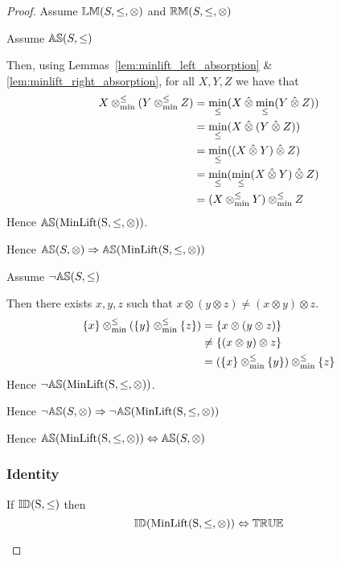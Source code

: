 \documentclass[../Summary.tex]{subfiles}
\begin{document}
\begin{proof}
Assume ${\mathbb{LM}}(S,\leq,\otimes)$ and ${\mathbb{RM}}(S,\leq,\otimes)$

Assume ${\mathbb{AS}}(S,\leq)$
\begin{ind}
Then, using Lemmas~\ref{lem:minlift_left_absorption} \& \ref{lem:minlift_right_absorption}, for all $X,Y,Z$ we have that
\begin{align*}
X \mathbin{\otimes_{\min}^{\leq}} (Y \mathbin{\otimes_{\min}^{\leq}} Z) 	& = \min_\leq(X \mathbin{\hat{\otimes}} \min_\leq(Y \mathbin{\hat{\otimes}} Z)) \\
							& = \min_\leq(X \mathbin{\hat{\otimes}} (Y \mathbin{\hat{\otimes}} Z)) \\
							& = \min_\leq((X \mathbin{\hat{\otimes}} Y) \mathbin{\hat{\otimes}} Z) \\
							& = \min_\leq(\min_\leq(X \mathbin{\hat{\otimes}} Y) \mathbin{\hat{\otimes}} Z) \\
							& = (X \mathbin{\otimes_{\min}^{\leq}} Y) \mathbin{\otimes_{\min}^{\leq}} Z
\end{align*}
Hence ${\mathbb{AS}}(\mathrm{MinLift(S,\leq,\otimes)})$.
\end{ind}
Hence ${\mathbb{AS}}(S,\otimes) \Rightarrow {\mathbb{AS}}(\mathrm{MinLift(S,\leq,\otimes)})$

\vspace{2em}


Assume $\neg {\mathbb{AS}}(S,\leq)$

\begin{ind}
Then there exists $x,y,z$ such that $x \otimes (y \otimes z) \neq (x \otimes y) \otimes z$.
\begin{align*}
\{ x \} \mathbin{\otimes_{\min}^{\leq}} (\{ y \} \mathbin{\otimes_{\min}^{\leq}} \{ z \}) 	& = \{x \otimes (y \otimes z)\} \\	
												& \neq \{ (x \otimes y) \otimes z \} \\
												& = (\{ x \} \mathbin{\otimes_{\min}^{\leq}} \{ y \}) \mathbin{\otimes_{\min}^{\leq}} \{ z \}
\end{align*}
Hence $\neg {\mathbb{AS}}(\mathrm{MinLift(S,\leq,\otimes)})$.
\end{ind}
Hence $\neg {\mathbb{AS}}(S,\otimes) \Rightarrow \neg {\mathbb{AS}}(\mathrm{MinLift(S,\leq,\otimes)})$

\vspace{2em}

Hence ${\mathbb{AS}}(\mathrm{MinLift(S,\leq,\otimes)}) \Leftrightarrow {\mathbb{AS}}(S,\otimes)$




\subsubsection{Identity}

\begin{theorem} \label{thm:minlift_id}
If ${\mathbb{ID}}\mathrm{(S,\leq)}$ then
\begin{equation*}
{\mathbb{ID}}(\mathrm{MinLift(S,\leq,\otimes)}) \Leftrightarrow {\mathbb{TRUE}}
\end{equation*}
\end{theorem}


\end{proof}
\end{document}

